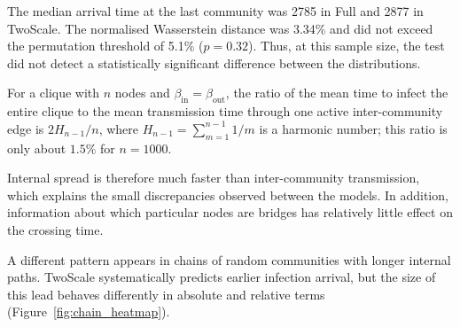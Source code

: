 \documentclass{ieeeaccess}
\newcommand{\michael}[2]{{\color{RoyalBlue}#1}}
\newcommand{\Full}{\textup{Full}}
\newcommand{\TS}{\textup{TwoScale}}
\begin{document}
The median arrival time at the last community was 2785 in \Full{} and 2877 in \TS{}. The normalised Wasserstein distance was 3.34\% and did not exceed the permutation threshold of 5.1\% ($p=0.32$). Thus, at this sample size, the test did not detect a statistically significant difference between the distributions.

For a clique with $n$ nodes and $\beta_{\mathrm{in}}=\beta_{\mathrm{out}}$, the ratio of the mean time to infect the entire clique to the mean transmission time through one active inter-community edge \michael{is $2H_{n-1}/n$, where $H_{n-1}=\sum_{m=1}^{n-1}1/m$ is a harmonic number; this ratio is only about $1.5\%$ for $n=1000$.}{is $2H_{n-1}/n$, which is only about $1.5\%$ for $n=1000$.}

Internal spread is therefore much faster than inter-community transmission, which explains the small discrepancies observed between the models. In addition, information about which particular nodes are bridges has relatively little effect on the crossing time.

A different pattern appears in chains of random communities with longer internal paths. \TS{} systematically predicts earlier infection arrival, but the size of this lead behaves differently in absolute and relative terms (Figure~\ref{fig:chain_heatmap}).
\end{document}
